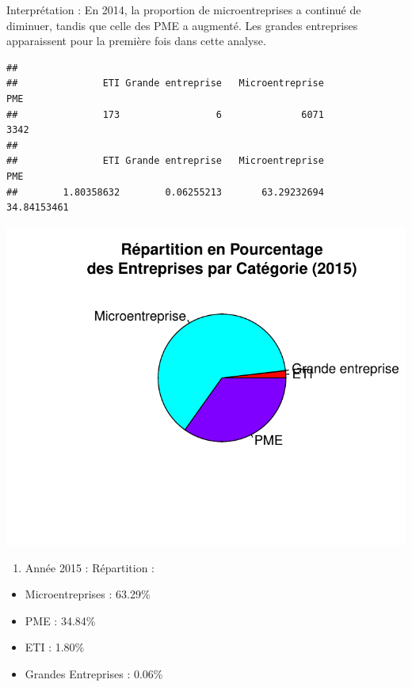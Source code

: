 \documentclass[mstat,12pt]{unswthesis}
\begin{document}
\medskip

Interprétation : En 2014, la proportion de microentreprises a continué
de diminuer, tandis que celle des PME a augmenté. Les grandes
entreprises apparaissent pour la première fois dans cette analyse.

\medskip

\begin{verbatim}
## 
##               ETI Grande entreprise   Microentreprise               PME 
##               173                 6              6071              3342 
## 
##               ETI Grande entreprise   Microentreprise               PME 
##        1.80358632        0.06255213       63.29232694       34.84153461
\end{verbatim}

\includegraphics{TDDT_projet_L_2_files/figure-latex/analyse_univariee_2015-1.pdf}

\medskip

\begin{enumerate}
\def\labelenumi{\arabic{enumi})}
\setcounter{enumi}{3}
\tightlist
\item
  Année 2015 : Répartition :
\end{enumerate}

\begin{itemize}
\tightlist
\item
  Microentreprises : 63.29\%
\item
  PME : 34.84\%
\item
  ETI : 1.80\%
\item
  Grandes Entreprises : 0.06\%
\end{itemize}
\end{document}
